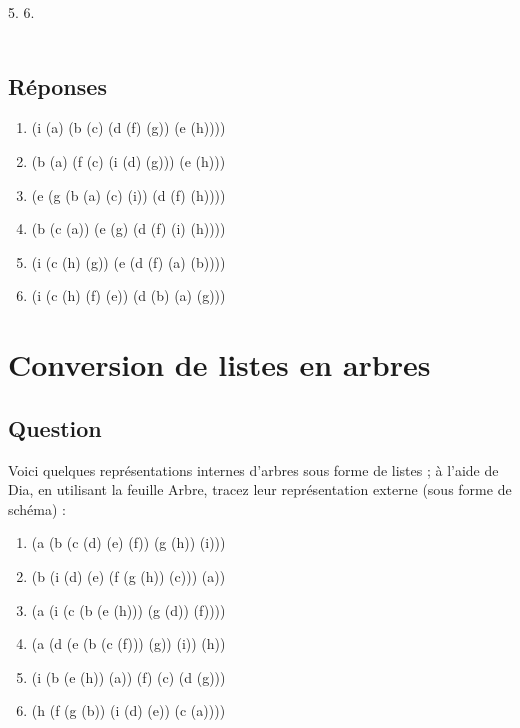 \documentclass[a4paper, 11pt]{article}
\begin{document}
5.  6. \\\\

\subsection{Réponses}
\begin{enumerate}
    \item (i (a) (b (c) (d (f) (g)) (e (h))))
    \item (b (a) (f (c) (i (d) (g))) (e (h)))
    \item (e (g (b (a) (c) (i)) (d (f) (h))))
    \item (b (c (a)) (e (g) (d (f) (i) (h))))
    \item (i (c (h) (g)) (e (d (f) (a) (b))))
    \item (i (c (h) (f) (e)) (d (b) (a) (g)))
\end{enumerate}

\section{Conversion de listes en arbres}
\subsection{Question}
Voici quelques représentations internes d'arbres sous forme de listes ; à l'aide de Dia, en utilisant la feuille Arbre, tracez leur représentation externe (sous forme de schéma) :
\begin{enumerate}
    \item (a (b (c (d) (e) (f)) (g (h)) (i)))
    \item (b (i (d) (e) (f (g (h)) (c))) (a))
    \item (a (i (c (b (e (h))) (g (d)) (f))))
    \item (a (d (e (b (c (f))) (g)) (i)) (h))
    \item (i (b (e (h)) (a)) (f) (c) (d (g)))
    \item (h (f (g (b)) (i (d) (e)) (c (a))))
\end{enumerate}
\end{document}
